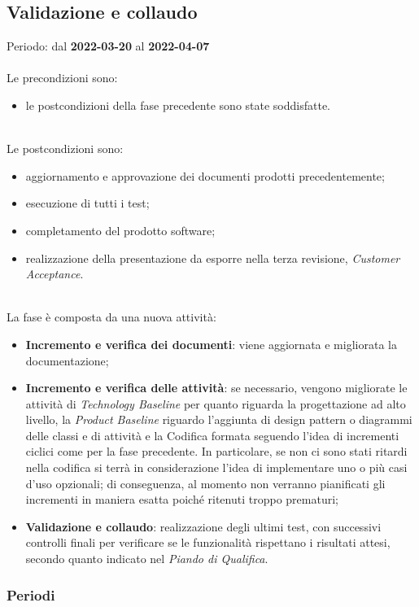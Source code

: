 \subsection{Validazione e collaudo}
Periodo: dal \textbf{2022-03-20} al \textbf{2022-04-07} \mbox{} \\ \mbox{} \\
Le precondizioni sono:
\begin{itemize}
	\item le postcondizioni della fase precedente sono state soddisfatte.
\end{itemize} \mbox{} \\
Le postcondizioni sono:
\begin{itemize}
	\item aggiornamento e approvazione dei documenti prodotti precedentemente;
	\item esecuzione di tutti i test;
	\item completamento del prodotto software;
	\item realizzazione della presentazione da esporre nella terza revisione, \textit{Customer Acceptance}. 
\end{itemize} \mbox{} \\
La fase è composta da una nuova attività:
\begin{itemize}
	\item \textbf{Incremento e verifica dei documenti}: viene aggiornata e migliorata la documentazione;
	\item \textbf{Incremento e verifica delle attività}: se necessario, vengono migliorate le attività di \textit{Technology Baseline} per quanto riguarda la progettazione ad alto livello, la \textit{Product Baseline} riguardo l’aggiunta di design pattern o diagrammi delle classi e di attività e la Codifica formata seguendo l’idea di incrementi ciclici come per la fase precedente. In particolare,  se non ci sono stati ritardi nella codifica si terrà in considerazione l’idea di implementare uno o più casi d’uso opzionali; di conseguenza,  al momento non verranno pianificati gli incrementi in maniera esatta poiché ritenuti troppo prematuri;
	\item \textbf{Validazione e collaudo}: realizzazione degli ultimi test, con successivi controlli finali per verificare se le funzionalità rispettano i risultati attesi,  secondo quanto indicato nel \textit{Piando di Qualifica}.
\end{itemize}

\subsubsection{Periodi}

